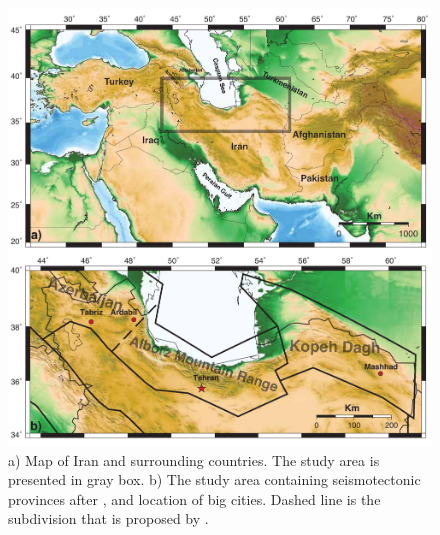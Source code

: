 \documentclass{article}
\begin{document}
\begin{figure} [H]
\centering
\includegraphics[scale=0.7]{figures/pdf/Figure1.pdf} 
\caption{ a) Map of Iran and surrounding countries. The study area is presented in gray box. b) The study area containing seismotectonic provinces after \citet{Mirzaei1998}, and location of big cities. Dashed line is the subdivision that is proposed by \citet{Karimiparidari2013}. }
 
\label{fig:Iran}
\end{figure}
\end{document}
